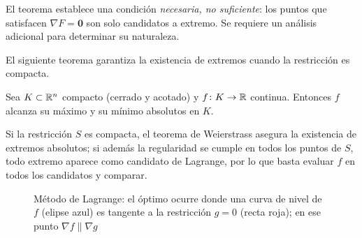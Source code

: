 \begin{rem}
El teorema establece una condición \emph{necesaria, no suficiente}: los puntos que satisfacen $\nabla F=\mathbf{0}$ son solo candidatos a extremo. Se requiere un análisis adicional para determinar su naturaleza.
\end{rem}

El siguiente teorema garantiza la existencia de extremos cuando la restricción es compacta.

\begin{theorem}[Weierstrass]
Sea $K\subset{\mathbb R}^n$ compacto (cerrado y acotado) y $f\colon K\to{\mathbb R}$ continua. Entonces $f$ alcanza su máximo y su mínimo absolutos en $K$.
\end{theorem}

Si la restricción $S$ es compacta, el teorema de Weierstrass asegura la existencia de extremos absolutos; si además la regularidad se cumple en todos los puntos de $S$, todo extremo aparece como candidato de Lagrange, por lo que basta evaluar $f$ en todos los candidatos y comparar.

\begin{figure}[!htbp]
\centering
{}
\caption{Método de Lagrange: el óptimo ocurre donde una curva de nivel
         de $f$ (elipse azul) es tangente a la restricción $g=0$ (recta roja);
         en ese punto $\nabla f \parallel \nabla g$}
\label{fig:lagrange_region_factible}
\end{figure}

